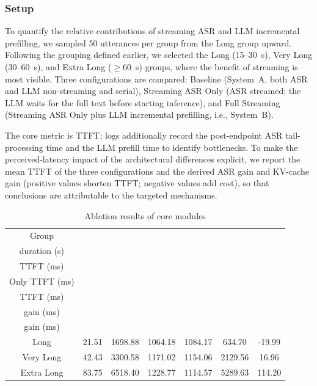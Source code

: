 \documentclass[conference]{IEEEtran}
\begin{document}
\subsubsection{Setup}

To quantify the relative contributions of streaming ASR and LLM incremental prefilling, we sampled 50 utterances per group from the Long group upward. Following the grouping defined earlier, we selected the Long (15--30~s), Very Long (30--60~s), and Extra Long ($\geq$60~s) groups, where the benefit of streaming is most visible. Three configurations are compared: Baseline (System~A, both ASR and LLM non-streaming and serial), Streaming ASR Only (ASR streamed; the LLM waits for the full text before starting inference), and Full Streaming (Streaming ASR Only plus LLM incremental prefilling, i.e., System~B).

The core metric is TTFT; logs additionally record the post-endpoint ASR tail-processing time and the LLM prefill time to identify bottlenecks. To make the perceived-latency impact of the architectural differences explicit, we report the mean TTFT of the three configurations and the derived ASR gain and KV-cache gain (positive values shorten TTFT; negative values add cost), so that conclusions are attributable to the targeted mechanisms.

\begin{table}[!t]
\caption{Ablation results of core modules}\label{tab:ablation}
\centering
\small
\begin{tabular*}{\textwidth}{@{\extracolsep\fill}ccccccc}
\toprule
Group & \begin{tabular}[c]{@{}c@{}}Mean\\duration (s)\end{tabular} & \begin{tabular}[c]{@{}c@{}}Baseline\\TTFT (ms)\end{tabular} & \begin{tabular}[c]{@{}c@{}}Streaming ASR\\Only TTFT (ms)\end{tabular} & \begin{tabular}[c]{@{}c@{}}Full Streaming\\TTFT (ms)\end{tabular} & \begin{tabular}[c]{@{}c@{}}ASR\\gain (ms)\end{tabular} & \begin{tabular}[c]{@{}c@{}}KV Cache\\gain (ms)\end{tabular} \\
\midrule
Long & 21.51 & 1698.88 & 1064.18 & 1084.17 & 634.70 & -19.99 \\
Very Long & 42.43 & 3300.58 & 1171.02 & 1154.06 & 2129.56 & 16.96 \\
Extra Long & 83.75 & 6518.40 & 1228.77 & 1114.57 & 5289.63 & 114.20 \\
\bottomrule
\end{tabular*}
\end{table}
\end{document}

